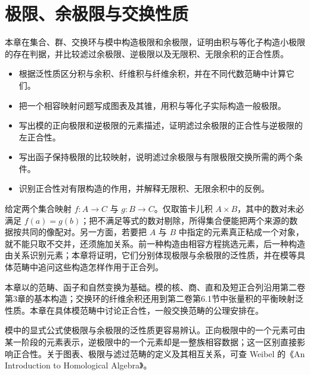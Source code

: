 
\chapter{极限、余极限与交换性质}
\label{b4:ch:02}

\begin{chapterabstract}
	本章在集合、群、交换环与模中构造极限和余极限，证明由积与等化子构造小极限的存在判据，并比较滤过余极限、逆极限以及无限积、无限余积的正合性质。
\end{chapterabstract}

\begin{learninggoals}
	\begin{itemize}
		\item 根据泛性质区分积与余积、纤维积与纤维余积，并在不同代数范畴中计算它们。
		\item 把一个相容映射问题写成图表及其锥，用积与等化子实际构造一般极限。
		\item 写出模的正向极限和逆极限的元素描述，证明滤过余极限的正合性与逆极限的左正合性。
		\item 写出函子保持极限的比较映射，说明滤过余极限与有限极限交换所需的两个条件。
		\item 识别正合性对有限构造的作用，并解释无限积、无限余积中的反例。
	\end{itemize}
\end{learninggoals}

给定两个集合映射 \(f:A\rightarrow C\) 与 \(g:B\rightarrow C\)。仅取笛卡儿积 \(A\times B\)，其中的数对未必满足 \(f(a)=g(b)\)；把不满足等式的数对剔除，所得集合便能把两个来源的数据按共同的像配对。另一方面，若要把 \(A\) 与 \(B\) 中指定的元素真正粘成一个对象，就不能只取不交并，还须施加关系。前一种构造由相容方程挑选元素，后一种构造由关系识别元素；本章将证明，它们分别体现极限与余极限的泛性质，并在模等具体范畴中追问这些构造怎样作用于正合列。

\ProseParagraphBreak
本章以的范畴、函子和自然变换为基础。模的核、商、直和及短正合列沿用第二卷第3章的基本构造；交换环的纤维余积还用到第二卷第6.1节中张量积的平衡映射泛性质。本章在具体模范畴中讨论正合性，一般交换范畴的公理安排在。

\ProseParagraphBreak
模中的显式公式使极限与余极限的泛性质更容易辨认。正向极限中的一个元素可由某一阶段的元素表示，逆极限中的一个元素却是一整族相容数据；这一区别直接影响正合性。关于图表、极限与滤过范畴的定义及其相互关系，可查 Weibel 的《An Introduction to Homological Algebra》\cite[Section A.5, A.5.1--A.5.4, pp. 427--429]{Weibel1994HomologicalAlgebra}。

